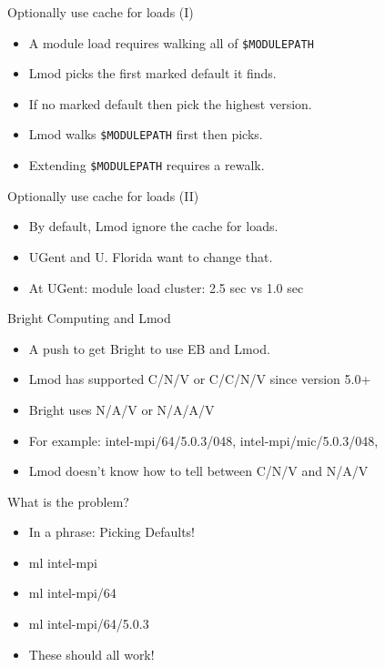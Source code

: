 \documentclass{beamer}
\begin{document}
\begin{frame}{Optionally use cache for loads (I)}
  \begin{itemize}
    \item A module load requires walking all of \texttt{\$MODULEPATH}
    \item Lmod picks the first marked default it finds.
    \item If no marked default then pick the highest version.
    \item Lmod walks \texttt{\$MODULEPATH} first then picks.
    \item Extending \texttt{\$MODULEPATH} requires a rewalk.
  \end{itemize}
\end{frame}

\begin{frame}{Optionally use cache for loads (II)}
  \begin{itemize}
    \item By default, Lmod ignore the cache for loads.
    \item UGent and U. Florida want to change that.
    \item At UGent: module load cluster: 2.5 sec vs 1.0 sec
  \end{itemize}
\end{frame}

\begin{frame}{Bright Computing and Lmod}
  \begin{itemize}
    \item A push to get Bright to use EB and Lmod.
    \item Lmod has supported C/N/V or C/C/N/V since version 5.0+
    \item Bright uses N/A/V or N/A/A/V
    \item For example: intel-mpi/64/5.0.3/048,
      intel-mpi/mic/5.0.3/048, 
    \item Lmod doesn't know how to tell between C/N/V and N/A/V
  \end{itemize}
\end{frame}

\begin{frame}{What is the problem?}
  \begin{itemize}
    \item In a phrase: Picking Defaults!
    \item ml intel-mpi
    \item ml intel-mpi/64
    \item ml intel-mpi/64/5.0.3
    \item These should all work!      
  \end{itemize}
\end{frame}
\end{document}
